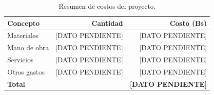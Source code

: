 \begin{table}[htbp]
    \centering
    \caption{Resumen de costos del proyecto.}
    \label{tab:costos}
    \begin{tabular}{lrr}
        \toprule
        \textbf{Concepto} & \textbf{Cantidad} & \textbf{Costo (Bs)} \\
        \midrule
        Materiales    & [DATO PENDIENTE] & [DATO PENDIENTE] \\
        Mano de obra  & [DATO PENDIENTE] & [DATO PENDIENTE] \\
        Servicios     & [DATO PENDIENTE] & [DATO PENDIENTE] \\
        Otros gastos  & [DATO PENDIENTE] & [DATO PENDIENTE] \\
        \midrule
        \textbf{Total} & & \textbf{[DATO PENDIENTE]} \\
        \bottomrule
    \end{tabular}
\end{table}
